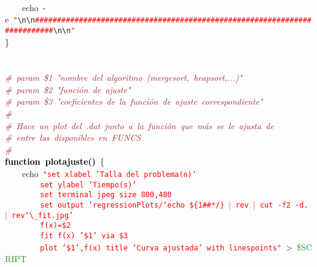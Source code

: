\mbox{}\ \ \ \  \\
\mbox{}\ \ \ \ echo\ -e\ \texttt{\textcolor{Red}{"{}}}\texttt{\textcolor{CarnationPink}{\textbackslash{}n\textbackslash{}n}}\texttt{\textcolor{Red}{\#\#\#\#\#\#\#\#\#\#\#\#\#\#\#\#\#\#\#\#\#\#\#\#\#\#\#\#\#\#\#\#\#\#\#\#\#\#\#\#\#\#\#\#\#\#\#\#\#\#\#\#\#\#\#\#\#\#\#\#\#\#\#\#\#\#\#\#\#\#\#\#\#\#}}\texttt{\textcolor{CarnationPink}{\textbackslash{}n\textbackslash{}n}}\texttt{\textcolor{Red}{"{}}} \\
\mbox{}\} \\
\mbox{} \\
\mbox{} \\
\mbox{}\textit{\textcolor{Brown}{\#\ param\ \$1\ "{}nombre\ del\ algoritmo\ (mergesort,\ heapsort,...)"{}}} \\
\mbox{}\textit{\textcolor{Brown}{\#\ param\ \$2\ "{}función\ de\ ajuste"{}}} \\
\mbox{}\textit{\textcolor{Brown}{\#\ param\ \$3\ "{}coeficientes\ de\ la\ función\ de\ ajuste\ correspondiente"{}}} \\
\mbox{}\textit{\textcolor{Brown}{\#}} \\
\mbox{}\textit{\textcolor{Brown}{\#\ Hace\ un\ plot\ del\ .dat\ junto\ a\ la\ función\ que\ más\ se\ le\ ajusta\ de}} \\
\mbox{}\textit{\textcolor{Brown}{\#\ entre\ las\ disponibles\ en\ FUNCS}} \\
\mbox{}\textit{\textcolor{Brown}{\#}} \\
\mbox{}\textbf{\textcolor{Black}{function\ plotajuste()}}\ \{ \\
\mbox{}\ \ \ \ echo\ \texttt{\textcolor{Red}{"{}set\ xlabel\ 'Talla\ del\ problema(n)'}} \\
\mbox{}\texttt{\textcolor{Red}{\ \ \ \ \ \ \ \ set\ ylabel\ 'Tiempo(s)'}} \\
\mbox{}\texttt{\textcolor{Red}{\ \ \ \ \ \ \ \ set\ terminal\ jpeg\ size\ 800,480}} \\
\mbox{}\texttt{\textcolor{Red}{\ \ \ \ \ \ \ \ set\ output\ 'regressionPlots/`echo\ \$\{1\#\#*/\}\ $|$\ rev\ $|$\ cut\ -f2\ -d.\ $|$\ rev`$\_$fit.jpg'}} \\
\mbox{}\texttt{\textcolor{Red}{\ \ \ \ \ \ \ \ f(x)=\$2}} \\
\mbox{}\texttt{\textcolor{Red}{\ \ \ \ \ \ \ \ fit\ f(x)\ '\$1'\ via\ \$3}} \\
\mbox{}\texttt{\textcolor{Red}{\ \ \ \ \ \ \ \ plot\ '\$1',f(x)\ title\ 'Curva\ ajustada'\ with\ linespoints"{}}}\ \textcolor{BrickRed}{\textgreater{}}\ \textcolor{ForestGreen}{\$SCRIPT} \\
